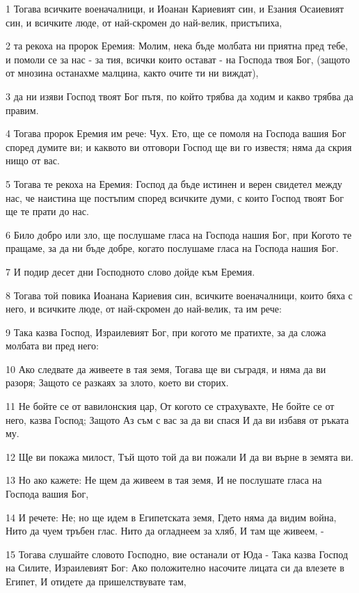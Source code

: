 \par 1 Тогава всичките военачалници, и Иоанан Кариевият син, и Езания Осаиевият син, и всичките люде, от най-скромен до най-велик, пристъпиха,
\par 2 та рекоха на пророк Еремия: Молим, нека бъде молбата ни приятна пред тебе, и помоли се за нас - за тия, всички които остават - на Господа твоя Бог, (защото от мнозина останахме малцина, както очите ти ни виждат),
\par 3 да ни изяви Господ твоят Бог пътя, по който трябва да ходим и какво трябва да правим.
\par 4 Тогава пророк Еремия им рече: Чух. Ето, ще се помоля на Господа вашия Бог според думите ви; и каквото ви отговори Господ ще ви го известя; няма да скрия нищо от вас.
\par 5 Тогава те рекоха на Еремия: Господ да бъде истинен и верен свидетел между нас, че наистина ще постъпим според всичките думи, с които Господ твоят Бог ще те прати до нас.
\par 6 Било добро или зло, ще послушаме гласа на Господа нашия Бог, при Когото те пращаме, за да ни бъде добре, когато послушаме гласа на Господа нашия Бог.
\par 7 И подир десет дни Господното слово дойде към Еремия.
\par 8 Тогава той повика Иоанана Кариевия син, всичките военачалници, които бяха с него, и всичките люде, от най-скромен до най-велик, та им рече:
\par 9 Така казва Господ, Израилевият Бог, при когото ме пратихте, за да сложа молбата ви пред него:
\par 10 Ако следвате да живеете в тая земя, Тогава ще ви съградя, и няма да ви разоря; Защото се разкаях за злото, което ви сторих.
\par 11 Не бойте се от вавилонския цар, От когото се страхувахте, Не бойте се от него, казва Господ; Защото Аз съм с вас за да ви спася И да ви избавя от ръката му.
\par 12 Ще ви покажа милост, Тъй щото той да ви пожали И да ви върне в земята ви.
\par 13 Но ако кажете: Не щем да живеем в тая земя, И не послушате гласа на Господа вашия Бог,
\par 14 И речете: Не; но ще идем в Египетската земя, Гдето няма да видим война, Нито да чуем тръбен глас. Нито да огладнеем за хляб, И там ще живеем, -
\par 15 Тогава слушайте словото Господно, вие останали от Юда - Така казва Господ на Силите, Израилевият Бог: Ако положително насочите лицата си да влезете в Египет, И отидете да пришелствувате там,

